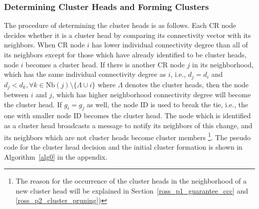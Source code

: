 \documentclass[times]{ettauth}
\newcommand{\ie}{i.e., }
\theoremstyle{mytheoremstyle}
\theoremstyle{mytheoremstyle}
\theoremstyle{mytheoremstyle}
\begin{document}
\subsubsection{Determining Cluster Heads and Forming Clusters}
The procedure of determining the cluster heads is as follows.
Each CR node decides whether it is a cluster head by comparing its connectivity vector with its neighbors.
When CR node $i$ has lower individual connectivity degree than all of its neighbors except for those which have already identified to be cluster heads, node $i$ becomes a cluster head.
If there is another CR node $j$ in its neighborhood, which has the same individual connectivity degree as $i$, \ie $d_j = d_i$ and $d_j < d_{k}, \forall k\in \text{Nb}(j)\setminus \{\Lambda\cup i\}$ where $\Lambda$ denotes the cluster heads, then the node between $i$ and $j$, which has higher neighborhood connectivity degree will become the cluster head.
If $g_i = g_j$ as well, the node ID is used to break the tie, \ie the one with smaller node ID becomes the cluster head.
%
The node which is identified as a cluster head broadcasts a message to notify its neighbors of this change, and its neighbors which are not cluster heads become cluster members
\footnote{The reason for the occurrence of the cluster heads in the neighborhood of a new cluster head will be explained in Section~\ref{ross_p1_guarantee_ccc} and \ref{ross_p2_cluster_pruning})}.
The pseudo code for the cluster head decision and the initial cluster formation is shown in Algorithm~\ref{alg0} in the appendix.
\end{document}
